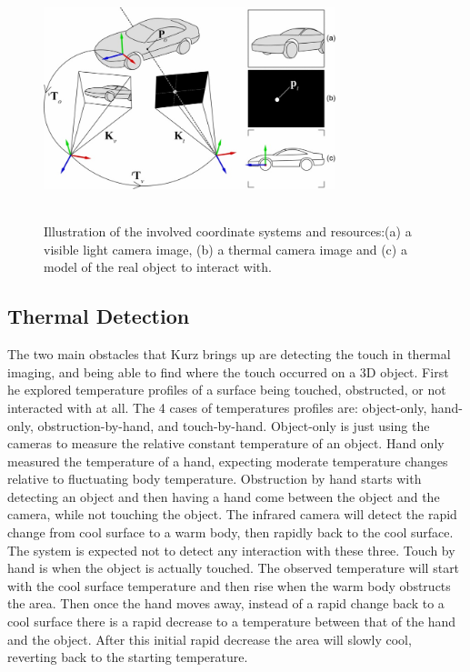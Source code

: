 \documentclass{sig-alternate}
\begin{document}
\begin{figure}
	\includegraphics[width=8.5cm, height=7cm]{Tracking}
	\caption{Illustration of the involved coordinate systems and resources:(a) a visible light camera image, (b) a thermal camera image and (c) a model of the real object to interact with.\cite{Thermal}}
	\label{fig:Tracking}
\end{figure}



\subsection{Thermal Detection}
\label{Thermal Detection}
The two main obstacles that Kurz brings up are detecting the touch in thermal imaging, and being able to find where the touch occurred on a 3D object. First he explored temperature profiles of a surface being touched, obstructed, or not interacted with at all. The 4 cases of temperatures profiles are: object-only, hand-only, obstruction-by-hand, and touch-by-hand. Object-only is just using the cameras to measure the relative constant temperature of an object. Hand only measured the temperature of a hand, expecting moderate temperature changes relative to fluctuating body temperature. Obstruction by hand starts with detecting an object and then having a hand come between the object and the camera, while not touching the object. The infrared camera will detect the rapid change from cool surface to a warm body, then rapidly back to the cool surface. The system is expected not to detect any interaction with these three. Touch by hand is when the object is actually touched. The observed temperature  will start with the cool surface temperature and then rise when the warm body obstructs the area. Then once the hand moves away, instead of a rapid change back to a cool surface there is a rapid decrease to a temperature between that of the hand and the object. After this initial rapid decrease the area will slowly cool, reverting back to the starting temperature. 
\end{document}
